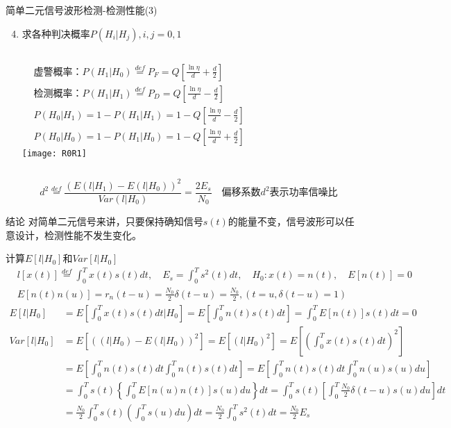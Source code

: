 \begin{frame}[shrink]{简单二元信号波形检测-检测性能(3)}
\begin{enumerate}
\setcounter{enumi}{3} 
\item 求各种判决概率$P(H_i|H_j),i,j=0,1$
\begin{columns}
\begin{align*}
&\text{虚警概率：} P(H_1|H_0)\mathop{=}\limits^{def}P_F=Q\left[\frac{\ln\eta}{d}+\frac{d}{2}\right]\\ 
&\text{检测概率：} P(H_1|H_1)\mathop{=}\limits^{def}P_D=Q\left[\frac{\ln\eta}{d}-\frac{d}{2}\right]\\
&P(H_0|H_1)=1-P(H_1|H_1)=1-Q\left[\frac{\ln\eta}{d}-\frac{d}{2}\right]\\
&P(H_0|H_0)=1-P(H_1|H_0)=1-Q\left[\frac{\ln\eta}{d}+\frac{d}{2}\right]
\end{align*}
\texttt{[image: R0R1]}
\end{columns}
\[d^2\mathop{=}\limits^{def}\frac{(E(l|H_1)-E(l|H_0))^2}{Var(l|H_0)}=\frac{2E_s}{N_0} \quad \text{偏移系数$d^2$表示功率信噪比}\]
\end{enumerate}
\begin{block}{结论}
对简单二元信号来讲，只要保持确知信号$s(t)$的能量不变，信号波形可以任意设计，检测性能不发生变化。
\end{block}
\end{frame}

\begin{frame}[shrink]{计算$E[l|H_0]$和$Var[l|H_0]$}
\begin{align*}
&l[x(t)]\mathop{=}\limits^{def}\int_{0}^{T}x(t)s(t)dt,\quad E_s=\int_{0}^{T}s^2(t)dt,\quad H_0:x(t)=n(t), \quad E[n(t)]=0\\
&E[n(t)n(u)]=r_n(t-u)=\frac{N_0}{2}\delta(t-u)=\frac{N_0}{2},(t=u,\delta(t-u)=1)
\end{align*}
\begin{align*}
E[l|H_0]&=E\left[\int_{0}^{T}x(t)s(t)dt|H_0\right]=E\left[\int_{0}^{T}n(t)s(t)dt\right]=\int_{0}^{T}E[n(t)]s(t)dt=0\\
Var[l|H_0]&=E[((l|H_0)-E(l|H_0))^2]=E[(l|H_0)^2]=E\left[\left(\int_{0}^{T}x(t)s(t)dt\right)^2\right]\\
&=E\left[\int_{0}^{T}n(t)s(t)dt\int_{0}^{T}n(t)s(t)dt\right]=E\left[\int_{0}^{T}n(t)s(t)dt\int_{0}^{T}n(u)s(u)du\right]\\
&=\int_{0}^{T}s(t)\left\{\int_{0}^{T}E[n(u)n(t)]s(u)du\right\}dt=\int_{0}^{T}s(t)\left[\int_{0}^{T}\frac{N_0}{2}\delta(t-u)s(u)du\right]dt\\
&=\frac{N_0}{2}\int_{0}^{T}s(t)\left(\int_{0}^{T}s(u)du\right)dt=\frac{N_0}{2}\int_{0}^{T}s^2(t)dt=\frac{N_0}{2}E_s
\end{align*}
\end{frame}


